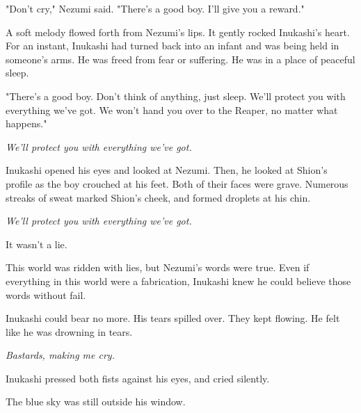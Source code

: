"Don't cry," Nezumi said. "There's a good boy. I'll give you a reward."

A soft melody flowed forth from Nezumi's lips. It gently rocked
Inukashi's heart. For an instant, Inukashi had turned back into an
infant and was being held in someone's arms. He was freed from fear or
suffering. He was in a place of peaceful sleep.

"There's a good boy. Don't think of anything, just sleep. We'll protect
you with everything we've got. We won't hand you over to the Reaper, no
matter what happens."

\emph{We'll protect you with everything we've got.}

Inukashi opened his eyes and looked at Nezumi. Then, he looked at
Shion's profile as the boy crouched at his feet. Both of their faces
were grave. Numerous streaks of sweat marked Shion's cheek, and formed
droplets at his chin.

\emph{We'll protect you with everything we've got.}

It wasn't a lie.

This world was ridden with lies, but Nezumi's words were true. Even if
everything in this world were a fabrication, Inukashi knew he could
believe those words without fail.

Inukashi could bear no more. His tears spilled over. They kept flowing.
He felt like he was drowning in tears.

\emph{Bastards, making me cry.}

Inukashi pressed both fists against his eyes, and cried silently.

The blue sky was still outside his window.